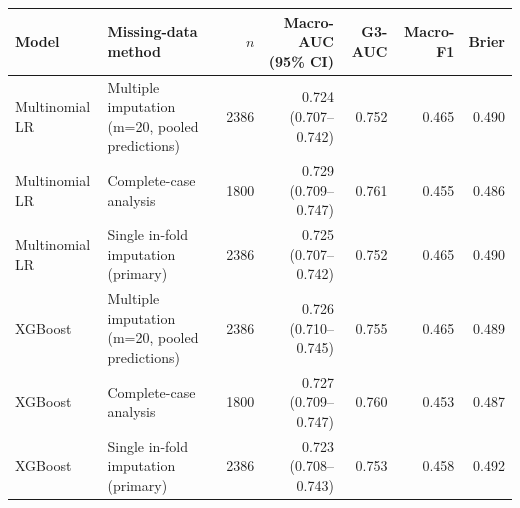\begin{tabular}{llrrrrr}
\toprule
Model & Missing-data method & $n$ & Macro-AUC (95\% CI) & G3-AUC & Macro-F1 & Brier \\
\midrule
Multinomial LR & Multiple imputation (m=20, pooled predictions) & 2386 & 0.724 (0.707--0.742) & 0.752 & 0.465 & 0.490 \\
Multinomial LR & Complete-case analysis & 1800 & 0.729 (0.709--0.747) & 0.761 & 0.455 & 0.486 \\
Multinomial LR & Single in-fold imputation (primary) & 2386 & 0.725 (0.707--0.742) & 0.752 & 0.465 & 0.490 \\
XGBoost & Multiple imputation (m=20, pooled predictions) & 2386 & 0.726 (0.710--0.745) & 0.755 & 0.465 & 0.489 \\
XGBoost & Complete-case analysis & 1800 & 0.727 (0.709--0.747) & 0.760 & 0.453 & 0.487 \\
XGBoost & Single in-fold imputation (primary) & 2386 & 0.723 (0.708--0.743) & 0.753 & 0.458 & 0.492 \\
\bottomrule
\end{tabular}